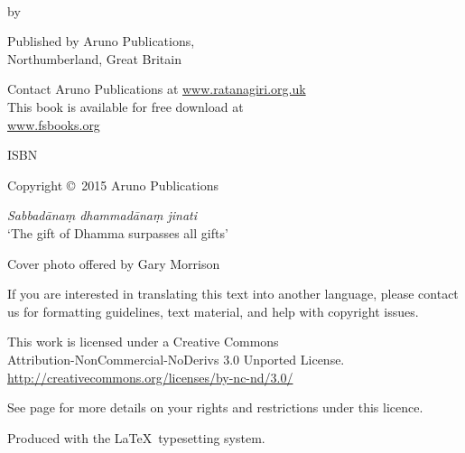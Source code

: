 \cleartoverso
\thispagestyle{empty}
{\copyrightsize\setlength{\parskip}{0.5\baselineskip}\setlength{\parindent}{0em}%
\raggedright%
\shaker\color[gray]{0.3}

\thetitle\\
by \theauthor

Published by Aruno Publications,\\
Northumberland, Great Britain

Contact Aruno Publications at \href{http://ratanagiri.org.uk/}{www.ratanagiri.org.uk}\\
This book is available for free download at\\
\href{http://fsbooks.org}{www.fsbooks.org}

ISBN \theISBN

Copyright \copyright\ 2015 Aruno Publications

\textit{Sabbadānaṃ dhammadānaṃ jinati}\\
`The gift of Dhamma surpasses all gifts'

Cover photo offered by Gary Morrison

{\tiny
If you are interested in translating this text into another language, please contact us for formatting guidelines, text material, and help with copyright issues.

This work is licensed under a Creative Commons\\
Attribution-NonCommercial-NoDerivs 3.0 Unported License.\\
\href{http://creativecommons.org/licenses/by-nc-nd/3.0/}{http://creativecommons.org/licenses/by-nc-nd/3.0/}

See page \pageref{copyright-details} for more details on your rights and restrictions under this licence.

Produced with the \LaTeX\ typesetting system.

\theEditionInfo

}
}

